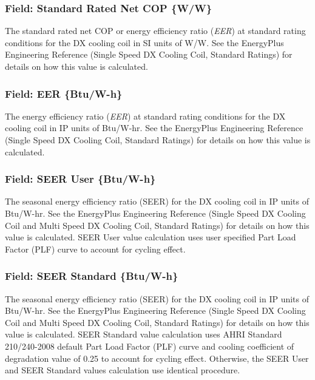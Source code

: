 \subsubsection{Field: Standard Rated Net COP \{W/W\}}\label{field-standard-rated-net-cop-ww}

The standard rated net COP or energy efficiency ratio (\emph{EER}) at standard rating conditions for the DX cooling coil in SI units of W/W. See the EnergyPlus Engineering Reference (Single Speed DX Cooling Coil, Standard Ratings) for details on how this value is calculated.

\subsubsection{Field: EER \{Btu/W-h\}}\label{field-eer-btuw-h}

The energy efficiency ratio (\emph{EER}) at standard rating conditions for the DX cooling coil in IP units of Btu/W-hr. See the EnergyPlus Engineering Reference (Single Speed DX Cooling Coil, Standard Ratings) for details on how this value is calculated.

\subsubsection{Field: SEER User \{Btu/W-h\}}

The seasonal energy efficiency ratio (SEER) for the DX cooling coil in IP units of Btu/W-hr. See the EnergyPlus Engineering Reference (Single Speed DX Cooling Coil and Multi Speed DX Cooling Coil, Standard Ratings) for details on how this value is calculated. SEER User value calculation uses user specified Part Load Factor (PLF) curve to account for cycling effect.

\subsubsection{Field: SEER Standard \{Btu/W-h\}}\label{field-seer-btuw-h}

The seasonal energy efficiency ratio (SEER) for the DX cooling coil in IP units of Btu/W-hr. See the EnergyPlus Engineering Reference (Single Speed DX Cooling Coil and Multi Speed DX Cooling Coil, Standard Ratings) for details on how this value is calculated. SEER Standard value calculation uses AHRI Standard 210/240-2008 default Part Load Factor (PLF) curve and cooling coefficient of degradation value of 0.25 to account for cycling effect. Otherwise, the SEER User and SEER Standard values calculation use identical procedure.

